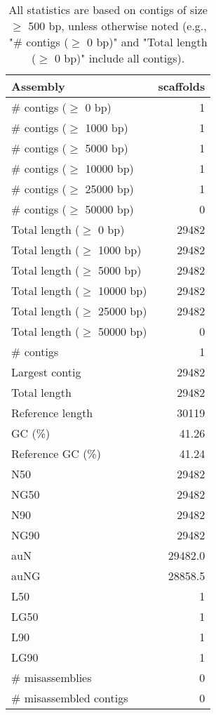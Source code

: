 \documentclass[12pt,a4paper]{article}
\begin{document}
\begin{table}[ht]
\begin{center}
\caption{All statistics are based on contigs of size $\geq$ 500 bp, unless otherwise noted (e.g., "\# contigs ($\geq$ 0 bp)" and "Total length ($\geq$ 0 bp)" include all contigs).}
\begin{tabular}{|l*{1}{|r}|}
\hline
Assembly & scaffolds \\ \hline
\# contigs ($\geq$ 0 bp) & 1 \\ \hline
\# contigs ($\geq$ 1000 bp) & 1 \\ \hline
\# contigs ($\geq$ 5000 bp) & 1 \\ \hline
\# contigs ($\geq$ 10000 bp) & 1 \\ \hline
\# contigs ($\geq$ 25000 bp) & 1 \\ \hline
\# contigs ($\geq$ 50000 bp) & 0 \\ \hline
Total length ($\geq$ 0 bp) & 29482 \\ \hline
Total length ($\geq$ 1000 bp) & 29482 \\ \hline
Total length ($\geq$ 5000 bp) & 29482 \\ \hline
Total length ($\geq$ 10000 bp) & 29482 \\ \hline
Total length ($\geq$ 25000 bp) & 29482 \\ \hline
Total length ($\geq$ 50000 bp) & 0 \\ \hline
\# contigs & 1 \\ \hline
Largest contig & 29482 \\ \hline
Total length & 29482 \\ \hline
Reference length & 30119 \\ \hline
GC (\%) & 41.26 \\ \hline
Reference GC (\%) & 41.24 \\ \hline
N50 & 29482 \\ \hline
NG50 & 29482 \\ \hline
N90 & 29482 \\ \hline
NG90 & 29482 \\ \hline
auN & 29482.0 \\ \hline
auNG & 28858.5 \\ \hline
L50 & 1 \\ \hline
LG50 & 1 \\ \hline
L90 & 1 \\ \hline
LG90 & 1 \\ \hline
\# misassemblies & 0 \\ \hline
\# misassembled contigs & 0 \\ \hline

\end{tabular}
\end{center}
\end{table}
\end{document}
